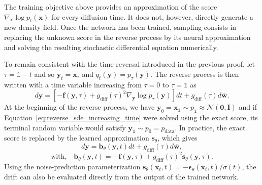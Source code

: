 The training objective above provides an approximation of the score
$\nabla_{\mathbf{x}}\log p_t(\mathbf{x})$ for every diffusion time. It does
not, however, directly generate a new density field. Once the network has been
trained, sampling consists in replacing the unknown score in the reverse
process by its neural approximation and solving the resulting stochastic
differential equation numerically.

To remain consistent with the time reversal introduced in the previous proof,
let $ \tau = \mathds{1} - t$ and so $ \mathbf{y}_t = \mathbf{x}_{\tau} $ and $ q_t(\mathbf{y}) = p_{\tau}(\mathbf{y}) $. The reverse process is then written with a time variable increasing from $ \tau = 0 $ to $ \tau = \mathds{1} $ as
\begin{equation}
    d\mathbf{y}
    =
    \left[
        -\mathbf{f}(\mathbf{y},\tau)
        +g_{\mathrm{diff}}(\tau)^2
        \nabla_{\mathbf{y}}\log p_{\tau}(\mathbf{y})
    \right]dt
    +
    g_{\mathrm{diff}}(\tau)d\overline{\mathbf{w}}.
    \label{eq:reverse_sde_increasing_time}
\end{equation}
At the beginning of the reverse process, we have $ \mathbf{y}_0=\mathbf{x}_{\mathds{1}} \sim p_{\mathds{1}} \approx \mathcal{N}(\mathbf{0},\mathbf{I}) $ and if Equation~\eqref{eq:reverse_sde_increasing_time} were solved using the exact
score, its terminal random variable would satisfy $ \mathbf{y}_{\mathds{1}}\sim p_0=p_{\mathrm{data}} $.
In practice, the exact score is replaced by the learned approximation
$\mathbf{s}_{\theta}$, which gives
\begin{equation}
    d\mathbf{y}
    =
    \mathbf{b}_{\theta}(\mathbf{y},t)dt
    +g_{\mathrm{diff}}(\tau)d\overline{\mathbf{w}},
    \label{eq:learned_reverse_sde_sampling}
\end{equation}
\vspace{-5pt}
\begin{equation*}
    \text{with,} \quad
    \mathbf{b}_{\theta}(\mathbf{y},t)
    =
    -\mathbf{f}(\mathbf{y},\tau)
    +g_{\mathrm{diff}}(\tau)^2
    \mathbf{s}_{\theta}(\mathbf{y},\tau).
    \label{eq:learned_reverse_drift_sampling}
\end{equation*}
Using the noise-prediction parameterization
$\mathbf{s}_{\theta}(\mathbf{x}_t,t)
=-\boldsymbol{\epsilon}_{\theta}(\mathbf{x}_t,t)/\sigma(t)$, the drift can
also be evaluated directly from the output of the trained network.

